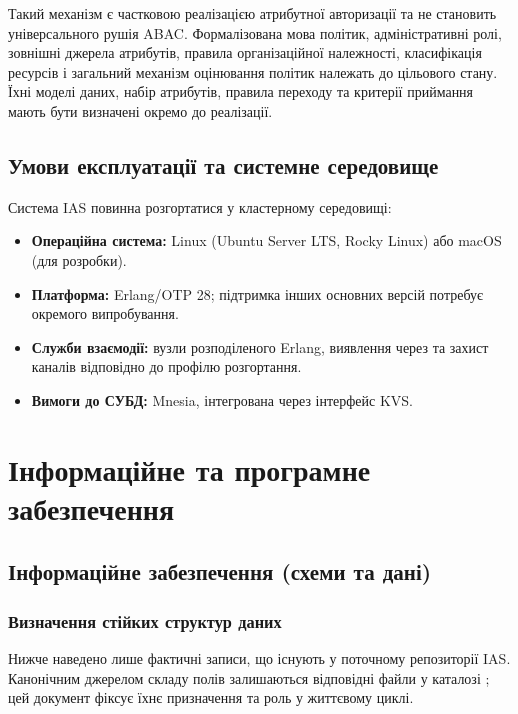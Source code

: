 \documentclass{article}
\begin{document}
Такий механізм є частковою реалізацією атрибутної авторизації та не становить універсального
рушія ABAC. Формалізована мова політик, адміністративні ролі, зовнішні джерела атрибутів,
правила організаційної належності, класифікація ресурсів і загальний механізм оцінювання
політик належать до цільового стану. Їхні моделі даних, набір атрибутів, правила переходу
та критерії приймання мають бути визначені окремо до реалізації.

\subsection{Умови експлуатації та системне середовище}
Система IAS повинна розгортатися у кластерному середовищі:
\begin{itemize}
    \item \textbf{Операційна система:} Linux (Ubuntu Server LTS, Rocky Linux) або macOS (для розробки).
    \item \textbf{Платформа:} Erlang/OTP 28; підтримка інших основних версій потребує окремого випробування.
    \item \textbf{Служби взаємодії:} вузли розподіленого Erlang, виявлення через  та захист каналів відповідно до профілю розгортання.
    \item \textbf{Вимоги до СУБД:} Mnesia, інтегрована через інтерфейс KVS.
\end{itemize}

\newpage
\section{Інформаційне та програмне забезпечення}

\subsection{Інформаційне забезпечення (схеми та дані)}

\subsubsection{Визначення стійких структур даних}
Нижче наведено лише фактичні записи, що існують у поточному репозиторії IAS. Канонічним джерелом складу полів залишаються відповідні файли у каталозі ; цей документ фіксує їхнє призначення та роль у життєвому циклі.
\end{document}
